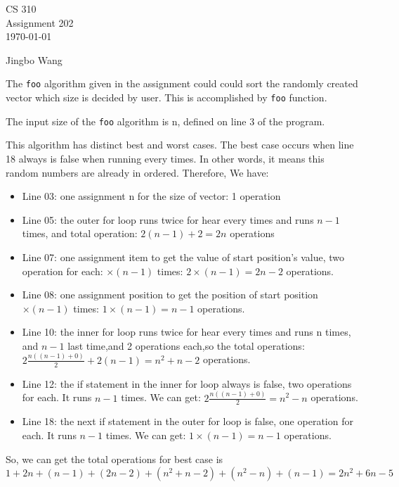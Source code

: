 \documentclass[11pt]{article}
\newcommand{\name}{Jingbo Wang}
\begin{document}
\thispagestyle{empty}

\begin{center}
{\large CS 310}\\
Assignment 202\\
\today
\end{center}

\begin{flushright}
\name{}
\end{flushright}

The \texttt{foo} algorithm given in the assignment could could sort the
randomly created vector which size is decided by user.
This is accomplished by \texttt{foo} function.

The input size of the \texttt{foo} algorithm is n, defined on line 3 of 
the program.  

This algorithm has distinct best and worst cases. The best case
occurs when line 18 always is false when running every times. In other 
words, it means this random numbers are already in ordered.
Therefore, We have:
\begin{itemize}
 \item Line 03: one assignment n for the size of vector: 1 operation
 \item Line 05: the outer for loop runs twice for hear every times  
                  and runs $n - 1$ times, and total operation: 
                  $2(n-1) + 2 = 2n$ operations
 \item Line 07: one assignment item to get the value of start 
                  position's value, two operation for each: 
                  $\times (n - 1)$ times: $2 \times (n - 1) = 2n - 2$
                  operations.
 \item Line 08: one assignment position to get the position of start 
                  position$\times (n - 1)$ times: $1 \times (n - 1) 
                  = n - 1$ operations.
 \item Line 10: the inner for loop runs twice for hear every times  
                  and runs n times, and $n - 1$ last time,and 2 
                  operations each,so the total operations: 
                  $2\frac{n((n-1) + 0)}{2} + 2(n - 1)= n^{2} + n - 2$
                  operations.
 \item Line 12: the if statement in the inner for loop always is 
                  false, two operations for each. It runs $n-1$ 
                  times. We can get: $2\frac{n((n-1) + 0)}{2} = 
                  n^{2} - n$ operations.
 \item Line 18: the next if statement in the outer for loop is false, 
                  one operation for each. It runs $n - 1$ times. 
                  We can get: $1 \times (n - 1) = n - 1$ operations.
\end{itemize}
So, we can get the total operations for best case is $1 + 2n + 
    (n - 1) + (2n - 2)+ (n^{2} + n - 2) + (n^{2} - n) + (n - 1)
    = 2n^{2} + 6n - 5$  
\end{document}
